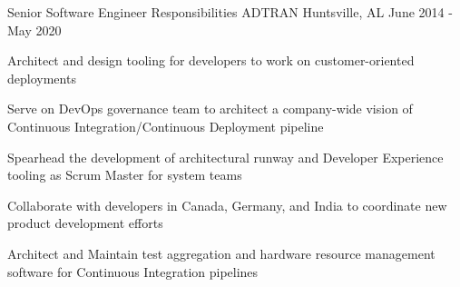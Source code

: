 
\begin{cventries}
  \cventry
    {Senior Software Engineer Responsibilities} %
    {ADTRAN} %
    {Huntsville, AL} %
    {June 2014 - May 2020} %
    {
      \begin{cvitems} %
        \item {Architect and design tooling for developers to work on customer-oriented deployments}
        \item {Serve on DevOps governance team to architect a company-wide vision of Continuous Integration/Continuous Deployment pipeline}
        \item {Spearhead the development of architectural runway and Developer Experience tooling as Scrum Master for system teams}
        \item {Collaborate with developers in Canada, Germany, and India to coordinate new product development efforts}
        \item {Architect and Maintain test aggregation and hardware resource management software for Continuous Integration pipelines}
      \end{cvitems}
    }

\end{cventries}
